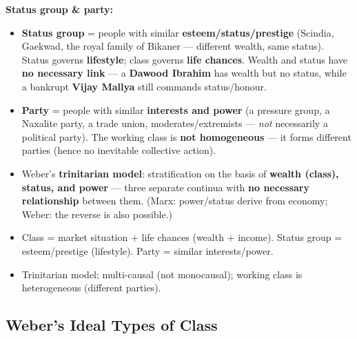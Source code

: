 \begin{KeyConcept}
\textbf{Status group \& party:}
\begin{itemize}
\item \textbf{Status group} = people with similar \textbf{esteem/status/prestige} (Scindia, Gaekwad, the royal family of Bikaner --- different wealth, same status). Status governs \textbf{lifestyle}; class governs \textbf{life chances}. Wealth and status have \textbf{no necessary link} --- a \textbf{Dawood Ibrahim} has wealth but no status, while a bankrupt \textbf{Vijay Mallya} still commands status/honour.
\item \textbf{Party} = people with similar \textbf{interests and power} (a pressure group, a Naxalite party, a trade union, moderates/extremists --- \textit{not} necessarily a political party). The working class is \textbf{not homogeneous} --- it forms different parties (hence no inevitable collective action).
\item Weber's \textbf{trinitarian model}: stratification on the basis of \textbf{wealth (class), status, and power} --- three separate continua with \textbf{no necessary relationship} between them. (Marx: power/status derive from economy; Weber: the reverse is also possible.)
\end{itemize}
\end{KeyConcept}

\begin{QuickRevision}
\begin{itemize}
\item Class = market situation + life chances (wealth + income). Status group = esteem/prestige (lifestyle). Party = similar interests/power.
\item Trinitarian model; multi-causal (not monocausal); working class is heterogeneous (different parties).
\end{itemize}
\end{QuickRevision}

\sectiondivider

\subsection{Weber's Ideal Types of Class}

